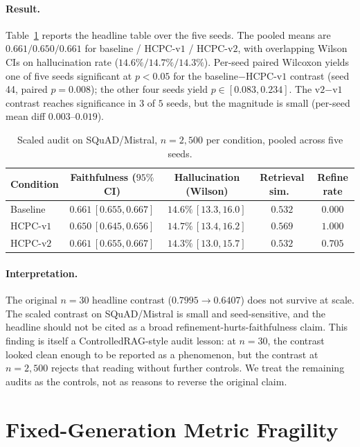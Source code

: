 \paragraph{Result.} Table~\ref{tab:scaling_main} reports the headline
table over the five seeds. The pooled means are
$0.661 / 0.650 / 0.661$ for baseline / HCPC-v$1$ / HCPC-v$2$, with
overlapping Wilson CIs on hallucination rate ($14.6\% / 14.7\% /
14.3\%$). Per-seed paired Wilcoxon yields one of five seeds significant
at $p<0.05$ for the baseline$-$HCPC-v$1$ contrast (seed 44, paired
$p=0.008$); the other four seeds yield $p \in [0.083, 0.234]$. The
v$2$$-$v$1$ contrast reaches significance in $3$ of $5$ seeds, but
the magnitude is small (per-seed mean diff $0.003$--$0.019$).

\begin{table}[!htb]
\centering
\caption{Scaled audit on SQuAD/Mistral, $n=2{,}500$ per condition,
pooled across five seeds.}
\label{tab:scaling_main}
\footnotesize
\begin{tabular}{lcccc}
\toprule
Condition & Faithfulness ($95\%$ CI) & Hallucination (Wilson) & Retrieval sim.\ & Refine rate \\
\midrule
Baseline   & $0.661 \, [0.655, 0.667]$ & $14.6\% \, [13.3, 16.0]$ & $0.532$ & $0.000$ \\
HCPC-v$1$  & $0.650 \, [0.645, 0.656]$ & $14.7\% \, [13.4, 16.2]$ & $0.569$ & $1.000$ \\
HCPC-v$2$  & $0.661 \, [0.655, 0.667]$ & $14.3\% \, [13.0, 15.7]$ & $0.532$ & $0.705$ \\
\bottomrule
\end{tabular}
\end{table}

\paragraph{Interpretation.} The original $n=30$ headline contrast
($0.7995 \to 0.6407$) does not survive at scale. The scaled contrast on
SQuAD/Mistral is small and seed-sensitive, and the headline should not
be cited as a broad refinement-hurts-faithfulness claim. This finding
is itself a ControlledRAG-style audit lesson: at $n=30$, the contrast
looked clean enough to be reported as a phenomenon, but the contrast at
$n=2{,}500$ rejects that reading without further controls. We treat the
remaining audits as the controls, not as reasons to reverse the
original claim.

\section{Fixed-Generation Metric Fragility}
\label{sec:metric_fragility}

